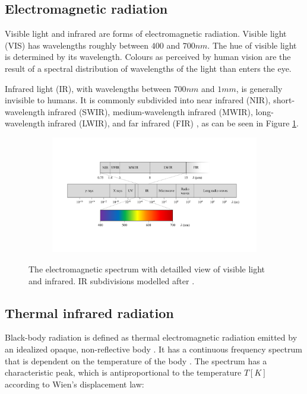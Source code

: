 \documentclass{l4proj}
\begin{document}
\subsection{Electromagnetic radiation}

Visible light and infrared are forms of electromagnetic radiation. Visible light (VIS) has wavelengths roughly between $400$ and $700 nm$. The hue of visible light is determined by its wavelength. Colours as perceived by human vision are the result of a spectral distribution of wavelengths of the light than enters the eye. 

Infrared light (IR), with wavelengths between $700 nm$ and $1 mm$, is generally invisible to humans. It is commonly subdivided into near infrared (NIR), short-wavelength infrared (SWIR), medium-wavelength infrared (MWIR), long-wavelength infrared (LWIR), and far infrared (FIR) \citep[p. 28]{byrnes_unexploded_2008}, as can be seen in Figure \ref{fig:em_spectrum}.

\begin{figure}[ht]
  \centering
  \begin{subfigure}[h!]{0.9\textwidth}
    \includegraphics[width=\textwidth, trim={1.5cm 4cm 2cm 4cm}, clip=true]{images/EM_spectrum.pdf}
  \end{subfigure}
  \caption{The electromagnetic spectrum with detailled view of visible light and infrared. IR subdivisions modelled after \citet[p. 28]{byrnes_unexploded_2008}.}
  \label{fig:em_spectrum}
\end{figure}

\subsection{Thermal infrared radiation}

Black-body radiation is defined as thermal electromagnetic radiation emitted by an idealized opaque, non-reflective body \citep{young_sears_2012}. It has a continuous frequency spectrum that is dependent on the temperature of the body \citep{kogure_thermodynamic_2007}. The spectrum has a characteristic peak, which is antiproportional to the temperature $T [K]$ according to Wien's displacement law:
\end{document}
